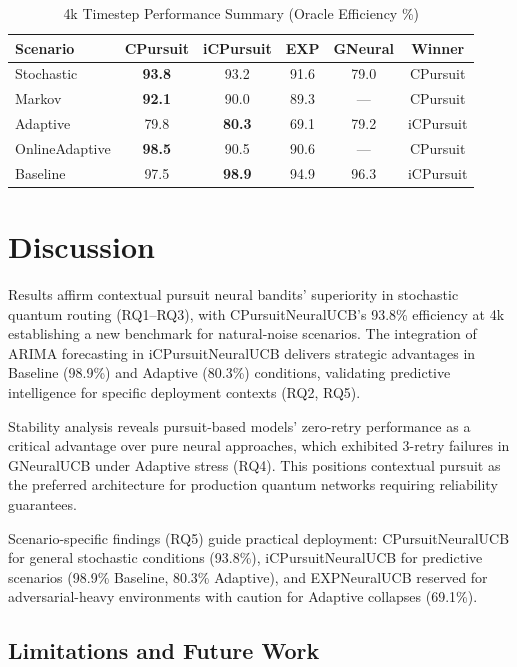 \documentclass[sigconf,anonymous,review,natbib=false]{acmart}
\begin{document}
\begin{table}[t]
\centering
\caption{4k Timestep Performance Summary (Oracle Efficiency \%)}
\label{tab:4k-results}
\begin{tabular}{lccccc}
\toprule
\textbf{Scenario} & \textbf{CPursuit} & \textbf{iCPursuit} & \textbf{EXP} & \textbf{GNeural} & \textbf{Winner} \\
\midrule
Stochastic & \textbf{93.8} & 93.2 & 91.6 & 79.0 & CPursuit \\
Markov & \textbf{92.1} & 90.0 & 89.3 & — & CPursuit \\
Adaptive & 79.8 & \textbf{80.3} & 69.1 & 79.2 & iCPursuit \\
OnlineAdaptive & \textbf{98.5} & 90.5 & 90.6 & — & CPursuit \\
Baseline & 97.5 & \textbf{98.9} & 94.9 & 96.3 & iCPursuit \\
\bottomrule
\end{tabular}
\end{table}


\section{Discussion} 
\label{sec:Discussion}

Results affirm contextual pursuit neural bandits' superiority in stochastic quantum routing (RQ1–RQ3), with CPursuitNeuralUCB's 93.8\% efficiency at 4k establishing a new benchmark for natural-noise scenarios. The integration of ARIMA forecasting in iCPursuitNeuralUCB delivers strategic advantages in Baseline (98.9\%) and Adaptive (80.3\%) conditions, validating predictive intelligence for specific deployment contexts (RQ2, RQ5).

Stability analysis reveals pursuit-based models' zero-retry performance as a critical advantage over pure neural approaches, which exhibited 3-retry failures in GNeuralUCB under Adaptive stress (RQ4). This positions contextual pursuit as the preferred architecture for production quantum networks requiring reliability guarantees.

Scenario-specific findings (RQ5) guide practical deployment: CPursuitNeuralUCB for general stochastic conditions (93.8\%), iCPursuitNeuralUCB for predictive scenarios (98.9\% Baseline, 80.3\% Adaptive), and EXPNeuralUCB reserved for adversarial-heavy environments with caution for Adaptive collapses (69.1\%).

\subsection{Limitations and Future Work} 
\label{sec: Threats}
\end{document}
